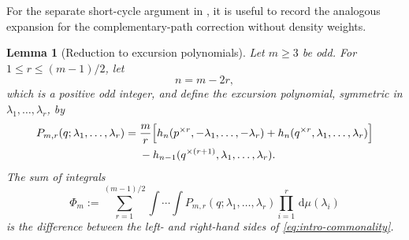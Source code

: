 \documentclass[11pt]{article}
\newtheorem{lemma}[theorem]{Lemma}
\numberwithin{equation}{section}
\newcommand{\dd}{\,\mathrm d}
\newcommand{\rep}[2]{#1^{\times #2}}
\begin{document}
For the separate short-cycle argument in ,
it is useful to record the analogous expansion for the
complementary-path correction without density weights.

\begin{lemma}[Reduction to excursion polynomials]
\label{lem:polynomial-reduction}
  Let $m\ge3$ be odd. For $1\le r\le(m-1)/2$, let
  \begin{equation}\label{eq:pge23-n}
    n=m-2r,
  \end{equation}
  which is a positive odd integer, and define the excursion polynomial,
  symmetric in $\lambda_1,\ldots,\lambda_r$, by
  \begin{align}
    P_{m,r}(q;\lambda_1,\ldots,\lambda_r)
    ={}&\frac mr\Bigl[
      h_n(\rep pr,-\lambda_1,\ldots,-\lambda_r)
      +h_n(\rep qr,\lambda_1,\ldots,\lambda_r)
    \Bigr]\notag\\
    &-h_{n-1}(\rep q{(r+1)},\lambda_1,\ldots,\lambda_r).
    \label{eq:Pmr}
  \end{align}
  The sum of integrals
  \begin{equation}\label{eq:Phi-expansion}
    \Phi_m:=\sum_{r=1}^{(m-1)/2}
      \int\!\cdots\!\int
      P_{m,r}(q;\lambda_1,\ldots,\lambda_r)
      \prod_{i=1}^r\dd\mu(\lambda_i)
  \end{equation}
  is the difference between the left- and right-hand sides of
  \eqref{eq:intro-commonality}.
\end{lemma}
\end{document}
